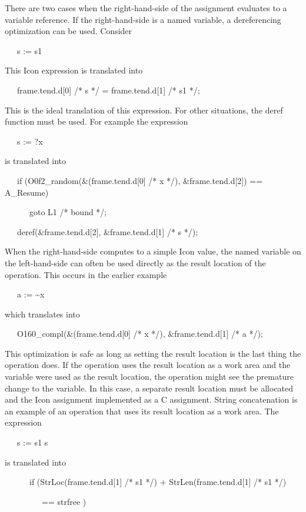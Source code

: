 There are two cases when the right-hand-side of the assignment
evaluates to a variable reference. If the right-hand-side is a named
variable, a dereferencing optimization can be used. Consider

{\ttfamily\mdseries
\ \ \ s := s1}


This Icon expression is translated into 

{\ttfamily\mdseries
\ \ \ frame.tend.d[0] /* s */ = frame.tend.d[1] /* s1 */;}


This is the ideal translation of this expression. For other
situations, the deref function must be used. For example the
expression

{\ttfamily\mdseries
\ \ \ s := ?x}

\noindent is translated into 

{\ttfamily\mdseries
\ \ \ if (O0f2\_random(\&(frame.tend.d[0] /* x */), \&frame.tend.d[2]) == A\_Resume)}

{\ttfamily\mdseries
\ \ \ \ \ \ goto L1 /* bound */;}

{\ttfamily\mdseries
\ \ \ deref(\&frame.tend.d[2], \&frame.tend.d[1] /* s */);}


When the right-hand-side computes to a simple Icon value, the named
variable on the left-hand-side can often be used directly as the
result location of the operation. This occurs in the earlier example

{\ttfamily\mdseries
\ \ \ a := \~{}x}

\noindent which translates into

{\ttfamily\mdseries
\ \ \ O160\_compl(\&(frame.tend.d[0] /* x */), \&frame.tend.d[1] /* a */);}


This optimization is safe as long as setting the result location is
the last thing the operation does. If the operation uses the result
location as a work area and the variable were used as the result
location, the operation might see the premature change to the
variable. In this case, a separate result location must be allocated
and the Icon assignment implemented as a C assignment. String
concatenation is an example of an operation that uses its result
location as a work area. The expression

{\ttfamily\mdseries
\ \ \ s := s1 {\textbar}{\textbar} s}


is translated into 

{\ttfamily\mdseries
\ \ \ \ \ \ if (StrLoc(frame.tend.d[1] /* s1 */) + StrLen(frame.tend.d[1] /* s1 */)}

{\ttfamily\mdseries
\ \ \ \ \ \ \ \ \ == strfree )}

